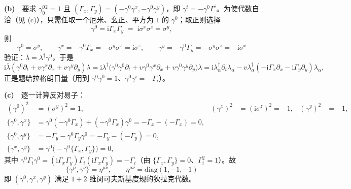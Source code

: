 \textbf{(b)}　要求 $\gamma^0_0{}^2=1$ 且 $(\Gamma_x,\Gamma_y)=(-\gamma^0\gamma^x,-\gamma^0\gamma^y)$，即 $\gamma^i=-\gamma^0\Gamma^i$。为使代数自洽（见 (c)），只需任取一个厄米、幺正、平方为 $1$ 的 $\gamma^0$；取正则选择
\begin{equation*}
\gamma^0=\mathrm{i}\Gamma_x\Gamma_y\;=\;\mathrm{i}\sigma^x\sigma^z=\sigma^y ,
\end{equation*}
则
\begin{equation*}
\boxed{\;\gamma^0=\sigma^y,\qquad \gamma^x=-\gamma^0\Gamma_x=-\sigma^y\sigma^x=\mathrm{i}\sigma^z,\qquad
\gamma^y=-\gamma^0\Gamma_y=-\sigma^y\sigma^z=-\mathrm{i}\sigma^x\;}
\end{equation*}
验证：$\bar{\lambda}=\lambda^{\dagger}\gamma^0$，于是
\begin{equation*}
\mathrm{i}\bar{\lambda}(\gamma^0\partial_t+v\gamma^x\partial_x+v\gamma^y\partial_y)\lambda
=\mathrm{i}\lambda^{\dagger}\big(\gamma^0\gamma^0\partial_t+v\gamma^0\gamma^x\partial_x+v\gamma^0\gamma^y\partial_y\big)\lambda
=\mathrm{i}\lambda^{\dagger}_\alpha\partial_t\lambda_\alpha
-v\lambda^{\dagger}_\alpha(-\mathrm{i}\Gamma_x\partial_x-\mathrm{i}\Gamma_y\partial_y)\lambda_\alpha ,
\end{equation*}
正是题给拉格朗日量（用到 $\gamma^0\gamma^0=1$、$\gamma^0\gamma^i=-\Gamma_i$）。

\textbf{(c)}　逐一计算反对易子：
\begin{align*}
(\gamma^0)^2&=(\sigma^y)^2=1, & (\gamma^x)^2&=(\mathrm{i}\sigma^z)^2=-1, & (\gamma^y)^2&=-1,\\
\{\gamma^0,\gamma^x\}&=\gamma^0(-\gamma^0\Gamma_x)+(-\gamma^0\Gamma_x)\gamma^0
=-\Gamma_x-(-\Gamma_x)=0,\\
\{\gamma^0,\gamma^y\}&=-\Gamma_y-\gamma^0\Gamma_y\gamma^0=-\Gamma_y-(-\Gamma_y)=0,\\
\{\gamma^x,\gamma^y\}&=\gamma^0\big(-\gamma^0\{\Gamma_x,\Gamma_y\}\big)=0,
\end{align*}
其中 $\gamma^0\Gamma_i\gamma^0=(\mathrm{i}\Gamma_x\Gamma_y)\Gamma_i(\mathrm{i}\Gamma_x\Gamma_y)=-\Gamma_i$（由 $\{\Gamma_x,\Gamma_y\}=0$、$\Gamma_i^2=1$）。故
\begin{equation*}
\boxed{\;\{\gamma^{\mu},\gamma^{\nu}\}=\eta^{\mu\nu},\qquad
\eta^{\mu\nu}=\mathrm{diag}(1,-1,-1)\;}
\end{equation*}
即 $(\gamma^0,\gamma^x,\gamma^y)$ 满足 $1+2$ 维闵可夫斯基度规的狄拉克代数。

